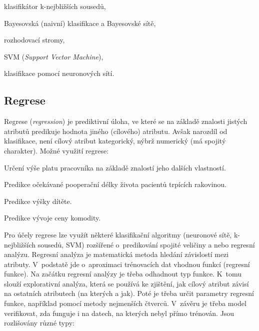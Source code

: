 \begin{compactitem}
    \item klasifikátor k-nejbližších sousedů,

    \item Bayesovská (naivní) klasifikace a Bayesovské sítě,

    \item rozhodovací stromy,

    \item SVM (\textit{Support Vector Machine}),

    \item klasifikace pomocí neuronových sítí.
\end{compactitem}

\subsection{Regrese}

Regrese (\textit{regression}) je prediktivní úloha, ve které se na základě znalosti jistých atributů predikuje hodnota jiného (cílového) atributu. Avšak narozdíl od klasifikace, není cílový atribut kategorický, nýbrž numerický (má spojitý charakter). Možné využití regrese:

\begin{compactitem}
    \item Určení výše platu pracovníka na základě znalostí jeho dalších vlastností.

    \item Predikce očekávané pooperační délky života pacientů trpících rakovinou.

    \item Predikce výšky dítěte.

    \item Predikce vývoje ceny komodity.
\end{compactitem}

Pro účely regrese lze využít některé klasifikační algoritmy (neuronové sítě, k-nejbližších sousedů, SVM) rozšířené o~predikování spojité veličiny a nebo regresní analýzu. Regresní analýza je matematická metoda hledání závislostí mezi atributy. V~podstatě jde o~aproximaci trénovacích dat vhodnou funkcí (regresní funkce). Na začátku regresní analýzy je třeba odhadnout typ funkce. K~tomu slouží explorativní analýza, která se používá ke zjištění, jak cílový atribut závisí na ostatních atributech (na kterých a jak). Poté je třeba určit parametry regresní funkce, například pomocí metody nejmenších čtverců. V~závěru je třeba model verifikovat, zda funguje i na datech, na kterých nebyl přímo trénován. Jsou rozlišovány různé typy:

